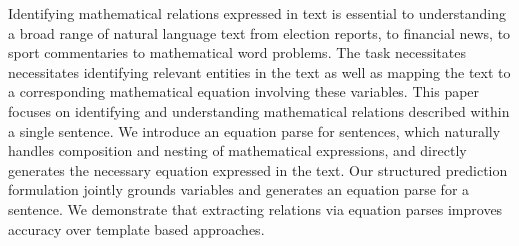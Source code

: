   Identifying mathematical relations expressed in text is essential to
  understanding a broad range of natural language text from election
  reports, to financial news, to sport commentaries to mathematical
  word problems.  The task necessitates necessitates identifying
  relevant entities in the text as well as mapping the text to a
  corresponding mathematical equation involving these variables.  This
  paper focuses on identifying and understanding mathematical
  relations described within a single sentence. We introduce an
  equation parse for sentences, which naturally handles composition
  and nesting of mathematical expressions, and directly generates the
  necessary equation expressed in the text. Our structured prediction
  formulation jointly grounds variables and generates an equation
  parse for a sentence. We demonstrate that extracting relations via
  equation parses improves accuracy over template based approaches.
